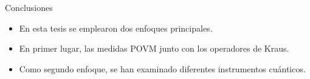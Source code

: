 \documentclass[svgnames,12pt,aspectratio=149]{beamer}
\begin{document}
\begin{frame}{Conclusiones}
    \begin{itemize}
      \item En esta tesis se emplearon dos enfoques
      principales.
      
      
      \item En primer lugar, las medidas POVM junto con los operadores de Kraus. 
      
      \item Como segundo enfoque, se han examinado diferentes instrumentos cuánticos. %
    \end{itemize}
\end{frame}
\end{document}
